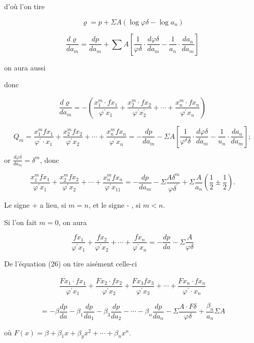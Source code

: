 \documentclass{article}
\begin{document}
d'où l'on tire

\[
\varrho=p+\Sigma A\left(\log \varphi \delta-\log a_{n}\right)
\]

\[
\frac{d \varrho}{d a_{m}}=\frac{d p}{d a_{m}}+\sum A\left[\frac{1}{\varphi \delta} \cdot \frac{d \varphi \delta}{d a_{m}}-\frac{1}{a_{n}} \cdot \frac{d a_{n}}{d a_{m}}\right]
\]

on aura aussi

donc

\[
\frac{d \varrho}{d a_{m}}=-\left(\frac{x_{1}^{m} \cdot f x_{1}}{\varphi^{\prime} x_{1}}+\frac{x_{2}^{m} \cdot f x_{2}}{\varphi^{\prime} x_{2}^{\prime}}+\cdots+\frac{x_{n}^{m} \cdot f x_{n}}{\varphi^{\prime} x_{n}}\right)
\]

\[
Q_{m}=\frac{x_{1}^{m} f x_{1}}{\varphi^{\prime} \cdot x_{1}}+\frac{x_{2}^{m} f x_{2}}{\varphi^{\prime} x_{2}}+\cdots+\frac{x_{n}^{m} f x_{n}}{\varphi^{\prime} x_{n}}=-\frac{d p}{d a_{m}}-\Sigma A\left[\frac{1}{\varphi^{\delta} \delta} \cdot \frac{d \varphi \delta}{d a_{m}}-\frac{1}{u_{n}} \cdot \frac{d a_{n}}{d a_{m}}\right] ;
\]

or \(\frac{d \varphi \delta}{d a_{m}}=\delta^{m}\), donc

\[
\frac{x_{1}^{m} f x_{1}}{\varphi^{\prime} x_{1}}+\frac{x_{2}^{m} f x_{2}}{\varphi^{\prime} x_{2}}+\cdots+\frac{x_{n}^{m} f x_{n}}{\varphi^{\prime} x_{11}}=-\frac{d p}{d a_{m}}-\Sigma \frac{A \delta^{m}}{\varphi \delta^{\prime}}+\Sigma \frac{A}{a_{n}}\left(\frac{1}{2} \pm \frac{1}{2}\right) .
\]

Le signe + a lieu, si \(m=n\), et le signe - , si \(m<n\).

Si l'on fait \(m=0\), on aura

\[
\frac{f x_{1}}{\varphi^{\prime} x_{1}}+\frac{f x_{2}}{\varphi^{\prime} x_{2}}+\cdots+\frac{f x_{n}}{\varphi^{\prime} x_{n}}=-\frac{d p}{d a}-\Sigma \frac{A}{\varphi \delta}
\]

De l'équation (26) on tire aisément celle-ci

\[
\frac{\dot{F x_{1}} \cdot f x_{1}}{\varphi^{\prime} x_{1}}+\frac{F x_{2} \cdot f x_{2}}{\varphi^{\prime} x_{2}}+\frac{F x_{3} f x_{3}}{\varphi^{\prime} x_{3}}+\cdots+\frac{F x_{n} \cdot f x_{n}}{\varphi^{\prime} \cdot x_{n}}
\]

\[
=-\beta \frac{d p}{d a}-\beta_{1} \frac{d p}{d a_{1}}-\beta_{3} \frac{d p}{d a_{2}}-\cdots-\beta_{n} \frac{d p}{d a_{n}}-\Sigma \frac{A \cdot F \delta}{\varphi \delta}+\frac{\beta_{n}}{a_{n}} \Sigma A
\]

où \(F(x)=\beta+\beta_{1} x+\beta_{y} x^{2}+\cdots+\beta_{n} x^{n}\).
\end{document}
